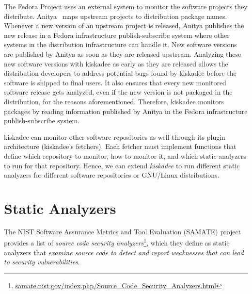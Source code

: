 The Fedora Project uses an external system to monitor the software projects they
distribute. Anitya~\citep{anitya} maps upstream projects to distribution package
names. Whenever a new version of an upstream project is released, Anitya
publishes the new release in a Fedora infrastructure publish-subscribe system
where other systems in the distribution infrastructure can handle it. New
software versions are published by Anitya as soon as they are released
upstream. Analyzing these new software versions with kiskadee as early as they
are released allows the distribution developers to address potential bugs found
by kiskadee before the software is shipped to final users. It also ensures that
every new monitored software release gets analyzed, even if the new version is not
packaged in the distribution, for the reasons aforementioned. Therefore,
kiskadee monitors packages by reading information published by Anitya in the
Fedora infrastructure publish-subscribe system.

kiskadee can monitor other software repositories as well through its plugin
architecture (kiskadee's fetchers). Each fetcher must implement functions that
define which repository to monitor, how to monitor it, and which static
analyzers to run for that repository. Hence, we can extend \textit{kiskadee} to
run different static analyzers for different software repositories or GNU/Linux
distributions.

\section{Static Analyzers}
\label{sec:analyzers}

The NIST Software Assurance Metrics and Tool Evaluation (SAMATE) project
provides a list of \textit{source code security
analyzers}\footnote{\url{samate.nist.gov/index.php/Source_Code_Security_Analyzers.html}},
which they define as static analyzers that \textit{examine source code to
detect and report weaknesses that can lead to security vulnerabilities}.

